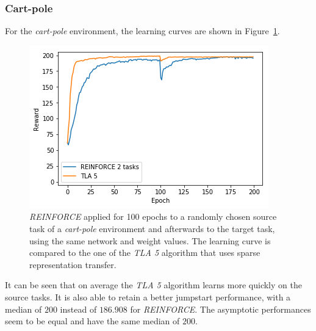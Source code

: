 \subsubsection{Cart-pole} %
\label{ssub:reinforce_source_target:cart_pole}
For the \textit{cart-pole} environment, the learning curves are shown in Figure~\ref{fig:carpole:reward_reinforce_2tasks}.
\begin{figure}[htb]
    \centering
    \includegraphics[width=.8\linewidth]{images/results/CartPole/reinforce_2tasks.png}
    \caption{\textit{REINFORCE} applied for 100 epochs to a randomly chosen source task of a \textit{cart-pole} environment and afterwards to the target task, using the same network and weight values. The learning curve is compared to the one of the \textit{TLA 5} algorithm that uses sparse representation transfer.}
    \label{fig:carpole:reward_reinforce_2tasks}
\end{figure}
It can be seen that on average the \textit{TLA 5} algorithm learns more quickly on the source tasks. It is also able to retain a better jumpstart performance, with a median of $200$ instead of $186.908$ for \textit{REINFORCE}. The asymptotic performances seem to be equal and have the same median of $200$.

